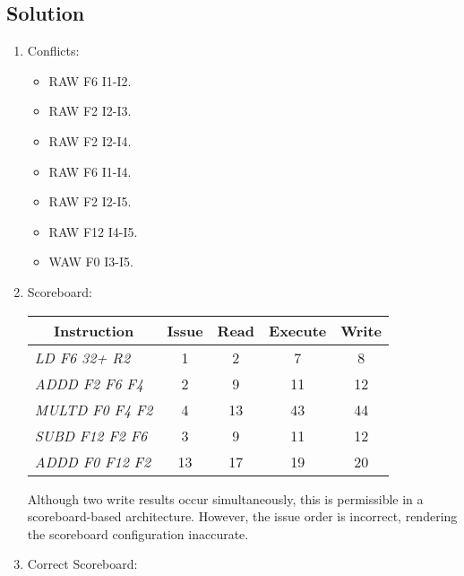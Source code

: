 \subsection*{Solution}
\begin{enumerate}
    \item Conflicts:
        \begin{itemize}
            \item RAW F6 I1-I2.
            \item RAW F2 I2-I3.
            \item RAW F2 I2-I4.
            \item RAW F6 I1-I4.
            \item RAW F2 I2-I5.
            \item RAW F12 I4-I5.
            \item WAW F0 I3-I5.
        \end{itemize}
    \item Scoreboard:
        \begin{table}[H]
            \centering
            \begin{tabular}{l|cccc}
            \multicolumn{1}{c|}{\textbf{Instruction}} & \textbf{Issue} & \textbf{Read} & \textbf{Execute} & \textbf{Write} \\ \hline
            \textit{LD F6 32+ R2}                     & 1              & 2                     & 7                           & 8                       \\
            \textit{ADDD F2 F6 F4}                    & 2              & 9                     & 11                          & 12                      \\
            \textit{MULTD F0 F4 F2}                   & 4              & 13                    & 43                          & 44                      \\
            \textit{SUBD F12 F2 F6}                   & 3              & 9                     & 11                          & 12                      \\
            \textit{ADDD F0 F12 F2}                   & 13             & 17                    & 19                          & 20                     
            \end{tabular}
        \end{table}
        Although two write results occur simultaneously, this is permissible in a scoreboard-based architecture. 
        However, the issue order is incorrect, rendering the scoreboard configuration inaccurate.
    \item Correct Scoreboard: 

\end{enumerate}
